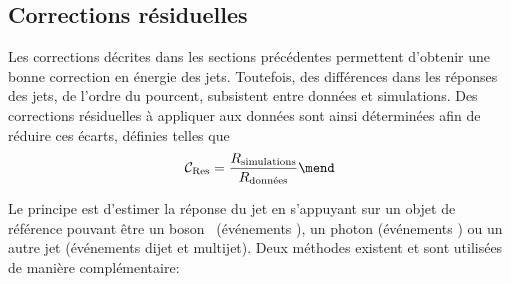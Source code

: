 \subsection{Corrections résiduelles}\label{chapter-JERC-section-CMS-subsec-residuals}
Les corrections décrites dans les sections précédentes permettent d'obtenir une bonne correction en énergie des jets.
Toutefois, des différences dans les réponses des jets, de l'ordre du pourcent, subsistent entre données et simulations.
Des corrections résiduelles à appliquer aux données sont ainsi déterminées afin de réduire ces écarts, définies telles que
\begin{equation}
\mathcal{C}_\text{Res} = \frac{R_\text{simulations}}{R_\text{données}}
\mend
\label{eq-chapter-JERC-section-CMS-subsec-residuals-Cres_def}
\end{equation}
\par Le principe est d'estimer la réponse du jet en s'appuyant sur un objet de référence pouvant être un boson \Zboson\ (événements \Zjets), un photon (événements \Gjets) ou un autre jet (événements dijet et multijet).
Deux méthodes existent et sont utilisées de manière complémentaire:
